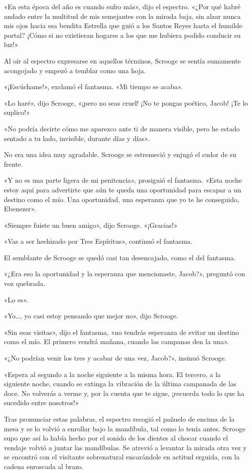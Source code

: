 \documentclass{novela}
\begin{document}
 «En esta época del año es cuando sufro más», dijo el espectro. «¿Por qué habré andado entre la multitud de mis semejantes con la mirada baja, sin alzar nunca mis ojos hacia esa bendita Estrella que guió a los Santos Reyes hasta el humilde portal? ¡Cómo si no existieran hogares a los que me hubiera podido conducir su luz!»

 Al oír al espectro expresarse en aquellos términos, Scrooge se sentía sumamente acongojado y empezó a temblar como una hoja.

 «¡Escúchame!», exclamó el fantasma. «Mi tiempo se acaba».

 «Lo haré», dijo Scrooge, «¡pero no seas cruel! ¡No te pongas poético, Jacob! ¡Te lo suplico!»

 «No podría decirte cómo me aparezco ante ti de manera visible, pero he estado sentado a tu lado, invisible, durante días y días».

 No era una idea muy agradable. Scrooge se estremeció y enjugó el sudor de su frente.

 «Y no es una parte ligera de mi penitencia», prosiguió el fantasma. «Esta noche estoy aquí para advertirte que aún te queda una oportunidad para escapar a un destino como el mío. Una oportunidad, una esperanza que yo te he conseguido, Ebenezer».

 «Siempre fuiste un buen amigo», dijo Scrooge. «¡Gracias!»

 «Vas a ser hechizado por Tres Espíritus», continuó el fantasma.

 El semblante de Scrooge se quedó casi tan desencajado, como el del fantasma.

 «¿Era eso la oportunidad y la esperanza que mencionaste, Jacob?», preguntó con voz quebrada.

 «Lo es».

 «Yo{\ldots}, yo casi estoy pensando que mejor no», dijo Scrooge.

 «Sin esas visitas», dijo el fantasma, «no tendrás esperanza de evitar un destino como el mío. El primero vendrá mañana, cuando las campanas den la una».

 «¿No podrían venir los tres y acabar de una vez, Jacob?», insinuó Scrooge.

 «Espera al segundo a la noche siguiente a la misma hora. El tercero, a la siguiente noche, cuando se extinga la vibración de la última campanada de las doce. No volverás a verme y, por la cuenta que te sigue, ¡recuerda todo lo que ha sucedido entre nosotros!»

 Tras pronunciar estas palabras, el espectro recogió el pañuelo de encima de la mesa y se lo volvió a enrollar bajo la mandíbula, tal como lo tenía antes. Scrooge supo que así lo había hecho por el sonido de los dientes al chocar cuando el vendaje volvió a juntar las mandíbulas. Se atrevió a levantar la mirada otra vez y se encontró con el visitante sobrenatural encarándole en actitud erguida, con la cadena enroscada al brazo.
\end{document}
